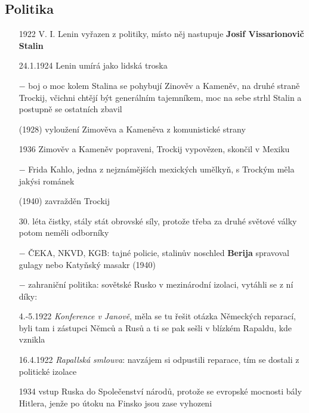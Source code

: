 \documentclass{article}
\begin{document}
\subsection*{Politika}
\begin{itemize}
    \vspace{-0.5em}
    \setlength\itemsep{0.15em}
    \item[1922] V. I. Lenin vyřazen z politiky, místo něj nastupuje \textbf{Josif Vissarionovič Stalin}
    \item[24.1.1924] Lenin umírá jako lidská troska
    \item[$-$] boj o moc kolem Stalina se pohybují Zinověv a Kameněv, na druhé straně Trockij, včichni chtějí být generálním tajemníkem, moc na sebe strhl Stalin a postupně se ostatních zbavil
    \item[(1928)] vyloužení Zimověva a Kameněva z komunistické strany
    \item[1936] Zimověv a Kameněv popraveni, Trockij vypovězen, skončil v Mexiku
    \item[$-$] Frida Kahlo, jedna z nejznámějších mexických umělkyň, s Trockým měla jakýsi románek
    \item[(1940)] zavražděn Trockij
    \item[30. léta] čistky, stály stát obrovské síly, protože třeba za druhé světové války potom neměli odborníky
    \item[$-$] ČEKA, NKVD, KGB: tajné policie, stalinův noschled \textbf{Berija} spravoval gulagy nebo Katyňský masakr (1940)
    \item[$-$] zahraniční politika: sovětské Rusko v mezinárodní izolaci, vytáhli se z ní díky:
    \item[4.-5.1922] \textit{Konference v Janově}, měla se tu řešit otázka Německých reparací, byli tam i zástupci Němců a Rusů a ti se pak sešli v blízkém Rapaldu, kde vznikla
    \item[16.4.1922] \textit{Rapallská smlouva}: navzájem si odpustili reparace, tím se dostali z politické izolace
    \item[1934] vstup Ruska do Společenství národů, protože se evropské mocnosti bály Hitlera, jenže po útoku na Finsko jsou zase vyhozeni
\end{itemize}
\end{document}
